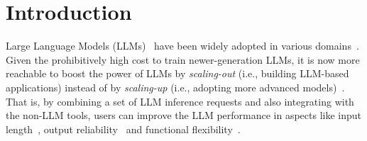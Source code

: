 \section{Introduction}
\label{sec:intro}


Large Language Models (LLMs)~\cite{brown2020language,floridi2020gpt,touvron2023llama} have been widely adopted in various domains~\cite{dosovitskiy2020image,stiennon2020learning,chen2021evaluating}.
Given the prohibitively high cost to train newer-generation LLMs, it is now more reachable to boost the power of LLMs by \emph{scaling-out} (i.e., building LLM-based applications) instead of by \emph{scaling-up} (i.e., adopting more advanced models)~\cite{compound_ai}. 
That is, by combining a set of LLM inference requests 
and also integrating with the non-LLM tools, users can improve the LLM performance in aspects like input length~\cite{jin2024comprehensive,lin2024infinite}, output reliability~\cite{chern2023factool,ji2023towards} and functional flexibility~\cite{shen2024hugginggpt,shen2024llm}.


